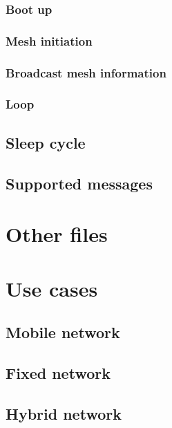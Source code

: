 			\subsubsection{Boot up}
			
			\subsubsection{Mesh initiation}
			
			\subsubsection{Broadcast mesh information}
			
			\subsubsection{Loop}
			
		\subsection{Sleep cycle}
		
			
		\subsection{Supported messages}
				
		
	\section{Other files}
			
	\section{Use cases}
		
		
		\subsection{Mobile network}
		
		\subsection{Fixed network}
		
		\subsection{Hybrid network}